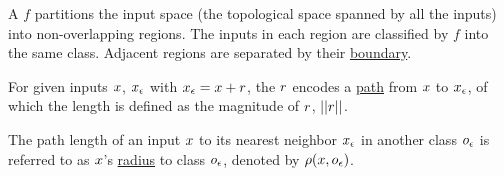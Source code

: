 \begin{definition}[Boundary]
A \dnn $f$ partitions the input space (the topological space spanned by all the inputs) into non-overlapping regions. The inputs in each region are classified by $f$ into the same class. Adjacent regions are separated by their \underline{boundary}.
\end{definition}





\begin{definition}[Path]
For given inputs $x$, $x_{\epsilon}$ with $x_{\epsilon} = x + r$, the \pv $r$ encodes a \underline{path} from $x$ to $x_{\epsilon}$, of which
the length is defined as the magnitude of $r$, $||r||$.
\end{definition}


\begin{definition}[Radius] The path length of an input $x$ to its nearest neighbor $x_{\epsilon}$ in another class $o_\epsilon$
     is referred to as $x$'s \underline{radius} to class $o_\epsilon$, denoted by $\rho (x, o_\epsilon)$.
\end{definition}




